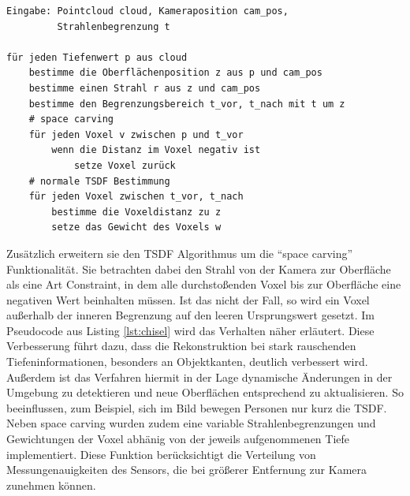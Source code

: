\begin{lstlisting}[caption=Chisel TSDF Algorithmus, label=lst:chisel]
Eingabe: Pointcloud cloud, Kameraposition cam_pos, 
         Strahlenbegrenzung t

für jeden Tiefenwert p aus cloud
    bestimme die Oberflächenposition z aus p und cam_pos
    bestimme einen Strahl r aus z und cam_pos
    bestimme den Begrenzungsbereich t_vor, t_nach mit t um z
    # space carving
    für jeden Voxel v zwischen p und t_vor
        wenn die Distanz im Voxel negativ ist
            setze Voxel zurück
    # normale TSDF Bestimmung
    für jeden Voxel zwischen t_vor, t_nach
        bestimme die Voxeldistanz zu z
        setze das Gewicht des Voxels w
\end{lstlisting}

Zusätzlich erweitern sie den TSDF Algorithmus um die \enquote{space carving} Funktionalität. Sie betrachten dabei den Strahl von der Kamera zur Oberfläche als eine Art Constraint, in dem alle durchstoßenden Voxel bis zur Oberfläche eine negativen Wert beinhalten müssen. Ist das nicht der Fall, so wird ein Voxel außerhalb der inneren Begrenzung auf den leeren Ursprungswert gesetzt. Im Pseudocode aus Listing \ref{lst:chisel} wird das Verhalten näher erläutert. Diese Verbesserung führt dazu, dass die Rekonstruktion bei stark rauschenden Tiefeninformationen, besonders an Objektkanten, deutlich verbessert wird. Außerdem ist das Verfahren hiermit in der Lage dynamische Änderungen in der Umgebung zu detektieren und neue Oberflächen entsprechend zu aktualisieren. So beeinflussen, zum Beispiel, sich im Bild bewegen Personen nur kurz die TSDF. \citep{Klingensmith_2015_7924}\\

Neben space carving wurden zudem eine variable Strahlenbegrenzungen und Gewichtungen der Voxel abhänig von der jeweils aufgenommenen Tiefe implementiert. Diese Funktion berücksichtigt die Verteilung von Messungenauigkeiten des Sensors, die bei größerer Entfernung zur Kamera zunehmen können. \citep{Klingensmith_2015_7924}